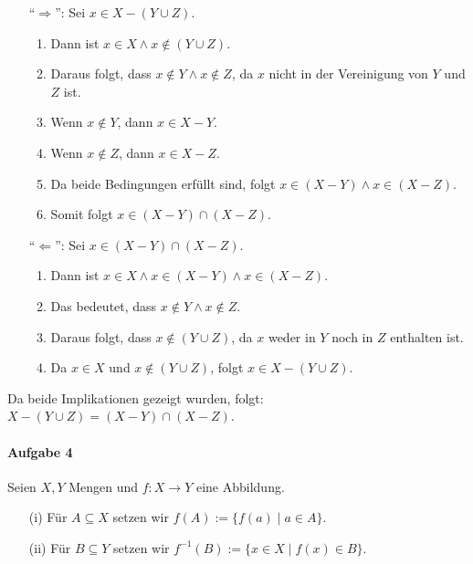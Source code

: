 \documentclass[12pt, letterpaper]{article}
\begin{document}
\begin{enumerate}
    \item[]{``$\Rightarrow$'':} Sei $x \in X - (Y \cup Z)$.
        \begin{enumerate}[label=$\circ$]
            \item Dann ist $x \in X \land x \notin (Y \cup Z)$.
            \item Daraus folgt, dass $x \notin Y \land x \notin Z$, da $x$ nicht in der Vereinigung von $Y$ und $Z$ ist.
            \item Wenn $x \notin Y$, dann $x \in X - Y$.
            \item Wenn $x \notin Z$, dann $x \in X - Z$.
            \item Da beide Bedingungen erfüllt sind, folgt $x \in (X - Y) \land x \in (X - Z)$.
            \item Somit folgt $x \in (X - Y) \cap (X - Z)$.
        \end{enumerate}
    \item[]{``$\Leftarrow$'':} Sei $x \in (X - Y) \cap (X - Z)$.
        \begin{enumerate}[label=$\circ$]
            \item Dann ist $x \in X \land x \in (X - Y) \land x \in (X - Z)$.
            \item Das bedeutet, dass $x \notin Y \land x \notin Z$.
            \item Daraus folgt, dass $x \notin (Y \cup Z)$, da $x$ weder in $Y$ noch in $Z$ enthalten ist.
            \item Da $x \in X$ und $x \notin (Y \cup Z)$, folgt $x \in X - (Y \cup Z)$.
        \end{enumerate}
\end{enumerate}

\noindent Da beide Implikationen gezeigt wurden, folgt: $X - (Y \cup Z) = (X - Y) \cap (X - Z)$. \\







\paragraph{Aufgabe 4}

\noindent Seien $X, Y$ Mengen und $f : X \to Y$ eine Abbildung.

\begin{enumerate}
    \item[(i)] Für $A \subseteq X$ setzen wir 
        $f(A) := \{f(a) \mid a \in A\}$.
    \item[(ii)] Für $B \subseteq Y$ setzen wir 
        $f^{-1}(B) := \{x \in X \mid f(x) \in B\}$.
\end{enumerate}
\end{document}
